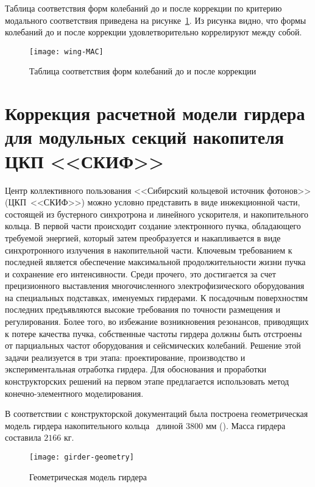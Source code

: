 Таблица соответствия форм колебаний до и после коррекции по критерию модального соответствия приведена на рисунке~\ref{fig:wing-MAC}. Из рисунка видно, что формы колебаний до и после коррекции удовлетворительно коррелируют между собой.

\begin{figure}[H]
	\centerfloat
	\texttt{[image: wing-MAC]}
	\caption{Таблица соответствия форм колебаний до и после коррекции} \label{fig:wing-MAC}
\end{figure}

\section{Коррекция расчетной модели гирдера для модульных секций накопителя ЦКП <<СКИФ>>}

Центр коллективного пользования <<Сибирский кольцевой источник фотонов>> (ЦКП~<<СКИФ>>) можно условно представить в виде инжекционной части, состоящей из бустерного синхротрона и линейного ускорителя, и накопительного кольца. В первой части происходит создание электронного пучка, обладающего требуемой энергией, который затем преобразуется и накапливается в виде синхротронного излучения в накопительной части. Ключевым требованием к последней является обеспечение максимальной продолжительности жизни пучка и сохранение его интенсивности. Среди прочего, это достигается за счет прецизионного выставления многочисленного электрофизического оборудования на специальных подставках, именуемых гирдерами. К посадочным поверхностям последних предъявляются высокие требования по точности размещения и регулирования. Более того, во избежание возникновения резонансов, приводящих к потере качества пучка, собственные частоты гирдера должны быть отстроены от парциальных частот оборудования и сейсмических колебаний. Решение этой задачи реализуется в три этапа: проектирование, производство и экспериментальная отработка гирдера. Для обоснования и проработки конструкторских решений на первом этапе предлагается использовать метод конечно-элементного моделирования.

В соответствии с конструкторской документаций была построена геометрическая модель гирдера накопительного кольца~ длиной $ 3800 $ мм (). Масса гирдера составила $ 2166 $ кг. 

\begin{figure}[H]
	\centering
	\texttt{[image: girder-geometry]}
	\caption{Геометрическая модель гирдера} \label{fig:girder-geometry}
\end{figure}


